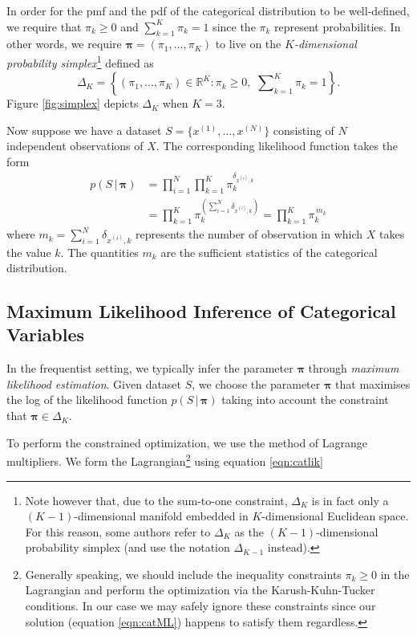 \documentclass[final,3p,times,twocolumn]{elsarticle}
\let\bs\boldsymbol
\begin{document}
In order for the pmf and the pdf of the categorical distribution to be well-defined, we require that $\pi_k \geq 0$ and $\sum_{k=1}^K \pi_k = 1$ since the $\pi_k$ represent probabilities.
In other words, we require $\bs \pi = (\pi_1,\dots,\pi_K)$ to live on the \emph{$K$-dimensional probability simplex}\footnote{Note however that, due to the sum-to-one constraint, $\Delta_K$ is in fact only a $(K-1)$-dimensional manifold embedded in $K$-dimensional Euclidean space.
For this reason, some authors refer to $\Delta_K$ as the $(K-1)$-dimensional probability simplex (and use the notation $\Delta_{K-1}$ instead).}
defined as
\begin{equation*}
\Delta_K = \left\{(\pi_1,\dots,\pi_K) \in \mathbb{R}^K : \pi_k \geq 0,\,\, \sum \nolimits _{k=1}^K \pi_k = 1\right\}.
\end{equation*}
Figure \ref{fig:simplex} depicts $\Delta_K$ when $K=3$.

Now suppose we have a dataset $S=\{ x^{(1)},\dots,x^{(N)} \}$ consisting of $N$ independent observations of $X$.
The corresponding likelihood function takes the form
\begin{equation}
\label{eqn:catlik}
\begin{split}
p(S\,|\,\bs \pi) &= \prod_{i=1}^N \prod_{k=1}^K \pi_k^{\delta_{x^{(i)},k}} \\ &= \prod_{k=1}^K \pi_k^{\left(\sum_{i=1}^N \delta_{x^{(i)},k}\right)} = \prod_{k=1}^K \pi_k^{\,m_k}
\end{split}
\end{equation}
where $m_k = \sum_{i=1}^N \delta_{x^{(i)}, k}$ represents the number of observation in which $X$ takes the value $k$.
The quantities $m_k$ are the sufficient statistics of the categorical distribution.

\subsection{Maximum Likelihood Inference of Categorical Variables}
In the frequentist setting, we typically infer the parameter $\bs \pi$ through \emph{maximum likelihood estimation}.
Given dataset $S$, we choose the parameter $\bs \pi$ that maximises the log of the likelihood function $p(S\,|\,\bs \pi)$ taking into account the constraint that $\bs \pi \in \Delta_K$.

To perform the constrained optimization, we use the method of Lagrange multipliers. We form the Lagrangian\footnote{Generally speaking, we should include the inequality constraints $\pi_k \geq 0$ in the Lagrangian and perform the optimization via the Karush-Kuhn-Tucker conditions.
In our case we may safely ignore these constraints since our solution (equation \ref{eqn:catML}) happens to satisfy them regardless.}
using equation \ref{eqn:catlik}
\end{document}
